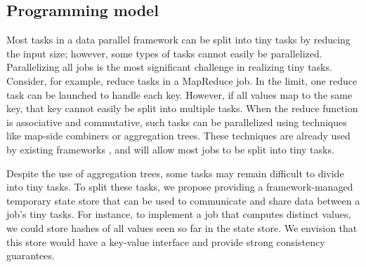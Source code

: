 \subsection{Programming model}
\label{sec:prog}
Most tasks in a data parallel framework can be split into tiny tasks by
reducing the input size; however, some types of tasks cannot easily be
parallelized. Parallelizing all jobs is the most significant challenge
in realizing tiny tasks.
Consider, for example, reduce tasks in a MapReduce job. In the limit,
one reduce task can be launched to handle each key. However, if all
values map to the same key, that key cannot easily be split into multiple
tasks.
When the reduce function is associative and commutative, such tasks can be parallelized using techniques like map-side combiners or aggregation trees.
These techniques are already used by existing frameworks \cite{yu2008dryadlinq}, and will allow most jobs to be split into tiny tasks.



Despite the use of aggregation trees, some tasks may remain
difficult to divide into tiny tasks.
To split these tasks, we propose providing a framework-managed
temporary state store that can be used to communicate and share data between a
job's tiny tasks.
For instance, to implement a job that computes distinct values, we could store hashes of all values seen so far in the state store.
We envision that this store would have a key-value interface and provide strong consistency guarantees.

